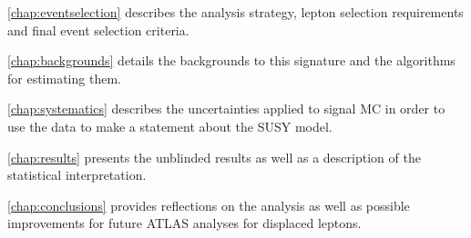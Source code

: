 \autoref{chap:eventselection} describes the analysis strategy, lepton selection requirements and final event selection criteria.

\autoref{chap:backgrounds} details the backgrounds to this signature and the algorithms for estimating them.

\autoref{chap:systematics} describes the uncertainties applied to signal \ac{MC} in order to use the data to make a statement about the \ac{SUSY} model.

\autoref{chap:results} presents the unblinded results as well as a description of the statistical interpretation. 

\autoref{chap:conclusions} provides reflections on the analysis as well as possible improvements for future \ac{ATLAS} analyses for displaced leptons.


